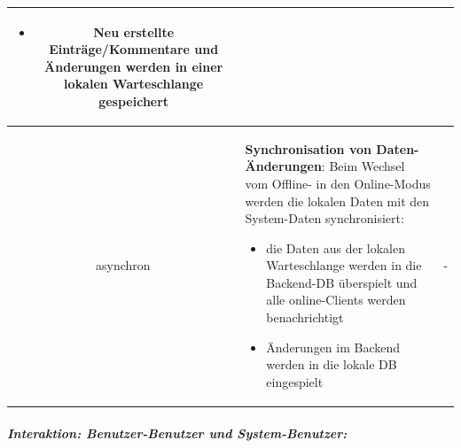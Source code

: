 \begin{table}[H]
\begin{adjustwidth}{-1.7cm}{1.7cm}
\begin{tabulary}{19cm}{|C|M|M|}
\begin{itemize}[leftmargin=*,noitemsep,topsep=0ex,parsep=1pt,partopsep=0pt]
	\item Neu erstellte Einträge/Kommentare und Änderungen werden in einer lokalen Warteschlange gespeichert
\end{itemize}
				\endgroup
\\ \hline
asynchron &
				\begingroup
    				\fontsize{9pt}{10pt}\selectfont
\textbf{Synchronisation von Daten-Änderungen}:\newline
Beim Wechsel vom Offline- in den Online-Modus werden die lokalen Daten mit den System-Daten synchronisiert:
\begin{itemize}[leftmargin=*,noitemsep,topsep=1ex,parsep=0pt,partopsep=0pt]
	\item die Daten aus der lokalen Warteschlange werden in die Backend-DB überspielt und alle online-Clients werden benachrichtigt
	\item Änderungen im Backend werden in die lokale DB eingespielt
\end{itemize}
				\endgroup
		& 
		\\ \hline
		\end{tabulary}
  		\end{adjustwidth}
	\end{table}
\vspace{1ex}\noindent
\subparagraph{Interaktion: Benutzer-Benutzer und System-Benutzer:}
